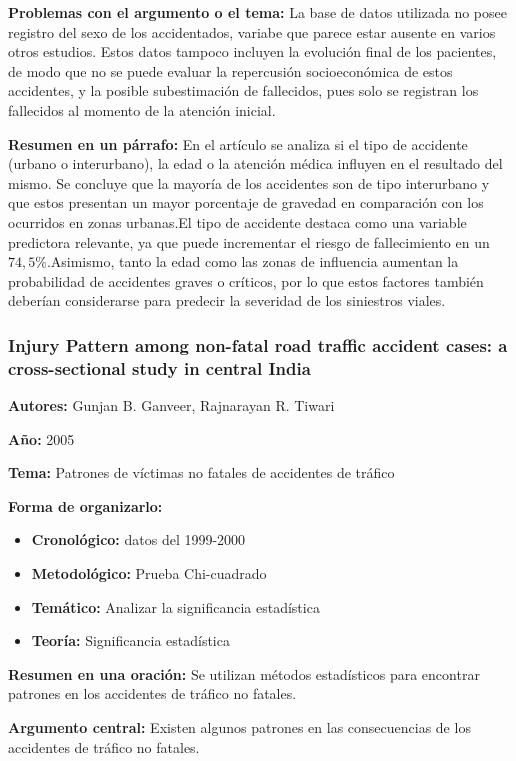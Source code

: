 \documentclass{book}
\begin{document}
\textbf{Problemas con el argumento o el tema:} La base de datos utilizada no posee registro del sexo de los accidentados, variabe que parece estar ausente en varios otros estudios. Estos datos tampoco incluyen la evolución final de los pacientes, de modo que no se puede evaluar la repercusión socioeconómica de estos accidentes, y la posible subestimación de fallecidos, pues solo se registran los fallecidos al momento de la atención inicial.

\textbf{Resumen en un párrafo:} En el artículo se analiza si el tipo de accidente (urbano o interurbano), la edad o la atención médica influyen en el resultado del mismo. Se concluye que la mayoría de los accidentes son de tipo interurbano y que estos presentan un mayor porcentaje de gravedad en comparación con los ocurridos en zonas urbanas.El tipo de accidente destaca como una variable predictora relevante, ya que puede incrementar el riesgo de fallecimiento en un $74,5\%$.Asimismo, tanto la edad como las zonas de influencia aumentan la probabilidad de accidentes graves o críticos, por lo que estos factores también deberían considerarse para predecir la severidad de los siniestros viales.

\subsubsection{Injury Pattern among non-fatal road traffic accident cases: a cross-sectional study in central India}
\textbf{Autores:} Gunjan B. Ganveer, Rajnarayan R. Tiwari

\textbf{Año:} 2005

\textbf{Tema:} Patrones de víctimas no fatales de accidentes de tráfico

\textbf{Forma de organizarlo:}

\begin{itemize}
\setlength{\itemindent}{0.5in}
    \item \textbf{Cronológico:} datos del 1999-2000
    \item \textbf{Metodológico:} Prueba Chi-cuadrado
    \item \textbf{Temático:} Analizar la significancia estadística
    \item \textbf{Teoría:} Significancia estadística
\end{itemize}

\textbf{Resumen en una oración:} Se utilizan métodos estadísticos para encontrar patrones en los accidentes de tráfico no fatales.

\textbf{Argumento central:} Existen algunos patrones en las consecuencias de los accidentes de tráfico no fatales.
\end{document}
